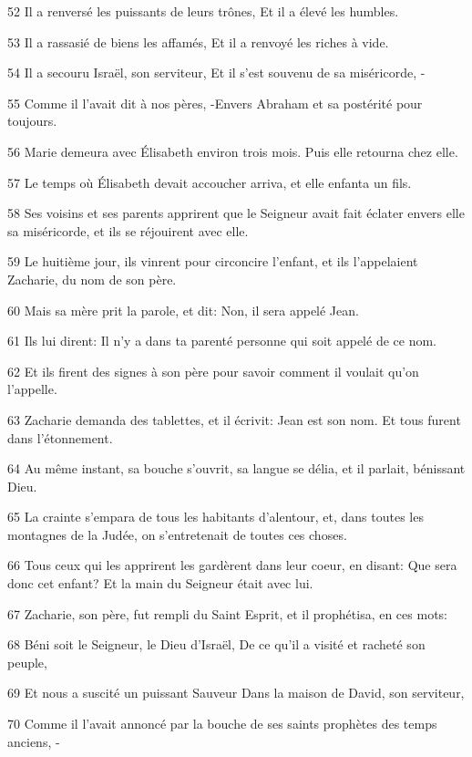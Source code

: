 \par 52 Il a renversé les puissants de leurs trônes, Et il a élevé les humbles.
\par 53 Il a rassasié de biens les affamés, Et il a renvoyé les riches à vide.
\par 54 Il a secouru Israël, son serviteur, Et il s'est souvenu de sa miséricorde, -
\par 55 Comme il l'avait dit à nos pères, -Envers Abraham et sa postérité pour toujours.
\par 56 Marie demeura avec Élisabeth environ trois mois. Puis elle retourna chez elle.
\par 57 Le temps où Élisabeth devait accoucher arriva, et elle enfanta un fils.
\par 58 Ses voisins et ses parents apprirent que le Seigneur avait fait éclater envers elle sa miséricorde, et ils se réjouirent avec elle.
\par 59 Le huitième jour, ils vinrent pour circoncire l'enfant, et ils l'appelaient Zacharie, du nom de son père.
\par 60 Mais sa mère prit la parole, et dit: Non, il sera appelé Jean.
\par 61 Ils lui dirent: Il n'y a dans ta parenté personne qui soit appelé de ce nom.
\par 62 Et ils firent des signes à son père pour savoir comment il voulait qu'on l'appelle.
\par 63 Zacharie demanda des tablettes, et il écrivit: Jean est son nom. Et tous furent dans l'étonnement.
\par 64 Au même instant, sa bouche s'ouvrit, sa langue se délia, et il parlait, bénissant Dieu.
\par 65 La crainte s'empara de tous les habitants d'alentour, et, dans toutes les montagnes de la Judée, on s'entretenait de toutes ces choses.
\par 66 Tous ceux qui les apprirent les gardèrent dans leur coeur, en disant: Que sera donc cet enfant? Et la main du Seigneur était avec lui.
\par 67 Zacharie, son père, fut rempli du Saint Esprit, et il prophétisa, en ces mots:
\par 68 Béni soit le Seigneur, le Dieu d'Israël, De ce qu'il a visité et racheté son peuple,
\par 69 Et nous a suscité un puissant Sauveur Dans la maison de David, son serviteur,
\par 70 Comme il l'avait annoncé par la bouche de ses saints prophètes des temps anciens, -
